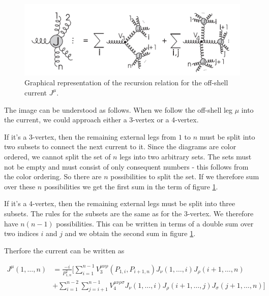 \documentclass{article}
\theoremstyle{definition}
\numberwithin{equation}{section}
\begin{document}
\begin{figure}[H]
    \begin{center}
        \includegraphics[scale=0.4,natwidth=1079,natheight=359]{rec.png}
        \caption{Graphical representation of the recursion relation for the off-shell current $J^{\mu}$.}
        \label{fig:recursion}
    \end{center}
\end{figure}

The image can be understood as follows. When we follow the off-shell leg $\mu$ into the current, we could approach either a $3$-vertex or a $4$-vertex.

If it's a $3$-vertex, then the remaining external legs from $1$ to $n$ must be split into two subsets to connect the next current to it. Since the diagrams are color ordered, we cannot split the set of $n$ legs into two arbitrary sets. The sets must not be empty and must consist of only consequent numbers - this follows from the color ordering. So there are $n$ possibilities to split the set. If we therefore sum over these $n$ possibilities we get the first sum in the term of figure \ref{fig:recursion}.

If it's a $4$-vertex, then the remaining external legs must be split into three subsets. The rules for the subsets are the same as for the $3$-vertex. We therefore have $n(n-1)$ possibilities. This can be written in terms of a double sum over two indices $i$ and $j$ and we obtain the second sum in figure \ref{fig:recursion}.

Therfore the current can be written as

\begin{equation}
    \begin{split}
        J^{\mu}(1, \dots , n) &= \frac{-i}{P_{1,n}^2} \Biggl[ \sum_{i=1}^{n-1} V_3^{\mu \nu \rho}(P_{1,i}, P_{i+1,n}) J_{\nu}(1, \dots, i) J_{\rho}(i+1, \dots , n) \\
        &+ \sum_{i=1}^{n-2} \sum_{j=i+1}^{n-1} V_4^{\mu \nu \rho \sigma} J_{\nu}(1, \dots, i) J_{\rho}(i+1, \dots, j)J_{\sigma}(j+1, \dots, n) \Biggr] \label{eq:recursion}
    \end{split}
\end{equation}
\end{document}
